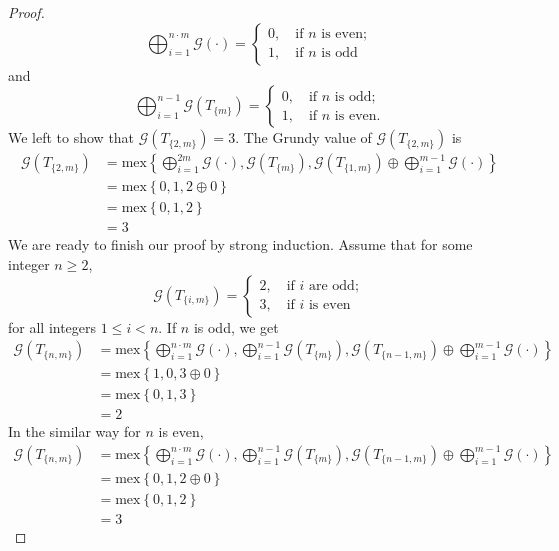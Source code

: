 \documentclass[12pt]{elsarticle}
\newtheorem*{theorem A}{Theorem A}
\newtheorem*{theorem B}{N\"olker's Theorem}
\theoremstyle{remark}
\theoremstyle{remark}
\theoremstyle{definition}
\begin{document}
\begin{proof}
\begin{equation*}
			\bigoplus_{i=1}^{n\cdot m}\mathcal{G}\left(\cdot\right) = \begin{cases}
				0,	\quad \text{if $n$ is even};\\
				1,	\quad \text{if $n$ is odd}
			\end{cases}
	\end{equation*}
	and
	\begin{equation*}
		\bigoplus_{i=1}^{n-1}\mathcal{G}\left(T_{\{m\}}\right) = \begin{cases}
			0,	\quad \text{if $n$ is odd};\\
			1,	\quad \text{if $n$ is even}.
		\end{cases}
	\end{equation*}
	We left to show that $\mathcal{G}\left(T_{\{2,m\}}\right) =  3$. The Grundy value of $\mathcal{G}\left(T_{\{2,m\}}\right)$ is
	\begin{align*}
		\mathcal{G}\left(T_{\{2,m\}}\right) &= \mathrm{mex}\left\{\bigoplus_{i=1}^{2 m}\mathcal{G}\left(\cdot\right), \mathcal{G}\left(T_{\{m\}}\right), \mathcal{G}\left(T_{\{1,m\}}\right) \oplus \bigoplus_{i=1}^{m-1}\mathcal{G}\left(\cdot\right)\right\}\\
		&= \mathrm{mex}\left\{0, 1, 2 \oplus 0\right\}\\
		&= \mathrm{mex}\left\{0, 1, 2 \right\}\\
		&= 3
	\end{align*}
	We are ready to finish our proof by strong induction. Assume that for some integer $n \ge 2$, 
	\begin{equation*}
		\mathcal{G}\left(T_{\{i,m\}}\right) = \begin{cases}
			2,	\quad \text{if $i$ are odd};\\
			3,	\quad \text{if $i$ is even}
		\end{cases}
	\end{equation*}
	for all integers $1 \le i < n$. If $n$ is odd, we get
	\begin{align*}
		\mathcal{G}\left(T_{\{n,m\}}\right) &= \mathrm{mex}\left\{\bigoplus_{i=1}^{n\cdot m}\mathcal{G}\left(\cdot\right), \bigoplus_{i=1}^{n-1}\mathcal{G}\left(T_{\{m\}}\right), \mathcal{G}\left(T_{\{n-1,m\}}\right) \oplus \bigoplus_{i=1}^{m-1}\mathcal{G}\left(\cdot\right)\right\}\\
		&= \mathrm{mex}\left\{1,0,3 \oplus 0\right\}\\
		&= \mathrm{mex}\left\{0,1,3\right\}\\
		&= 2
	\end{align*}
	In the similar way for $n$ is even,
	\begin{align*}
		\mathcal{G}\left(T_{\{n,m\}}\right) &= \mathrm{mex}\left\{\bigoplus_{i=1}^{n\cdot m}\mathcal{G}\left(\cdot\right), \bigoplus_{i=1}^{n-1}\mathcal{G}\left(T_{\{m\}}\right), \mathcal{G}\left(T_{\{n-1,m\}}\right) \oplus \bigoplus_{i=1}^{m-1}\mathcal{G}\left(\cdot\right)\right\}\\
		&= \mathrm{mex}\left\{0,1,2 \oplus 0\right\}\\
		&= \mathrm{mex}\left\{0,1,2\right\}\\
		&= 3
	\end{align*}
\end{proof}
\end{document}
